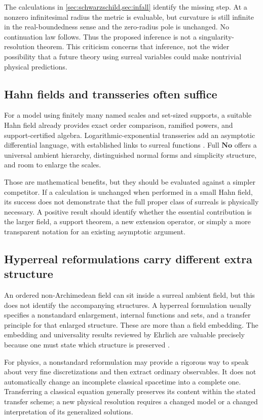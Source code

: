 \documentclass[11pt,a4paper]{article}
\numberwithin{equation}{section}
\theoremstyle{definition}
\theoremstyle{remark}
\newcommand{\No}{\mathbf{No}}
\begin{document}
The calculations in \cref{sec:schwarzschild,sec:infall} identify the missing
step. At a nonzero infinitesimal radius the metric is evaluable, but curvature
is still infinite in the real-boundedness sense and the zero-radius pole is
unchanged. No continuation law follows. Thus the proposed inference is not a
singularity-resolution theorem. This criticism concerns that inference, not
the wider possibility that a future theory using surreal variables could make
nontrivial physical predictions.

\subsection{Hahn fields and transseries often suffice}
For a model using finitely many named scales and set-sized supports, a
suitable Hahn field already provides exact order comparison, ramified powers,
and support-certified algebra. Logarithmic-exponential transseries add an
asymptotic differential language, with established links to surreal functions
\cite{BMgerms}. Full $\No$ offers a universal ambient hierarchy, distinguished
normal forms and simplicity structure, and room to enlarge the scales.

Those are mathematical benefits, but they should be evaluated against a
simpler competitor. If a calculation is unchanged when performed in a small
Hahn field, its success does not demonstrate that the full proper class of
surreals is physically necessary. A positive result should identify whether
the essential contribution is the larger field, a support theorem, a new
extension operator, or simply a more transparent notation for an existing
asymptotic argument.

\subsection{Hyperreal reformulations carry different extra structure}
An ordered non-Archimedean field can sit inside a surreal ambient field, but
this does not identify the accompanying structures. A hyperreal formulation
usually specifies a nonstandard enlargement, internal functions and sets, and
a transfer principle for that enlarged structure. These are more than a field
embedding. The embedding and universality results reviewed by Ehrlich are
valuable precisely because one must state which structure is preserved
\cite{Ehrlich}.

For physics, a nonstandard reformulation may provide a rigorous way to speak
about very fine discretizations and then extract ordinary observables. It does
not automatically change an incomplete classical spacetime into a complete
one. Transferring a classical equation generally preserves its content within
the stated transfer scheme; a new physical resolution requires a changed
model or a changed interpretation of its generalized solutions.
\end{document}
